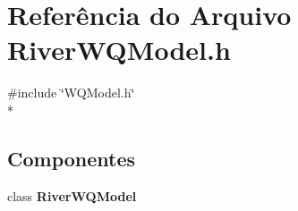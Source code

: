 \section{Referência do Arquivo River\+W\+Q\+Model.\+h}
\label{_river_w_q_model_8h}
{\ttfamily \#include \char`\"{}W\+Q\+Model.\+h\char`\"{}}\\*
\subsection*{Componentes}
\begin{DoxyCompactItemize}
\item 
class {\bf River\+W\+Q\+Model}
\end{DoxyCompactItemize}
